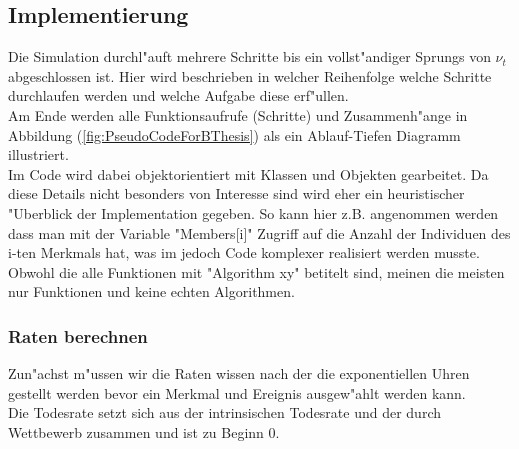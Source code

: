 \documentclass[11pt, a4paper, german]{article}
\theoremstyle{plain}
\begin{document}
	\subsection{Implementierung}
	Die Simulation durchl"auft mehrere Schritte bis ein vollst"andiger Sprungs von $ \nu_t $ abgeschlossen ist. Hier wird beschrieben in welcher Reihenfolge welche Schritte durchlaufen werden und welche Aufgabe diese erf"ullen.\\
	Am Ende werden alle Funktionsaufrufe (Schritte) und Zusammenh"ange in Abbildung (\ref{fig:PseudoCodeForBThesis}) als ein Ablauf-Tiefen Diagramm illustriert.\\
	Im Code wird dabei objektorientiert mit Klassen und Objekten gearbeitet. Da diese Details nicht besonders von Interesse sind wird eher ein heuristischer "Uberblick der Implementation gegeben. So kann hier z.B. angenommen werden dass man mit der Variable "{}Members[i]"{} Zugriff auf die Anzahl der Individuen des i-ten Merkmals hat, was im jedoch Code komplexer realisiert werden musste.\\
	Obwohl die alle Funktionen mit "{}Algorithm xy"{} betitelt sind, meinen die meisten nur Funktionen und keine echten Algorithmen.
	
	\subsubsection{Raten berechnen}	
	Zun"achst m"ussen wir die Raten wissen nach der die exponentiellen Uhren gestellt werden bevor ein Merkmal und Ereignis ausgew"ahlt werden kann.\\
	Die Todesrate setzt sich aus der intrinsischen Todesrate und der durch Wettbewerb zusammen und ist zu Beginn 0.\\
	
\end{document}
